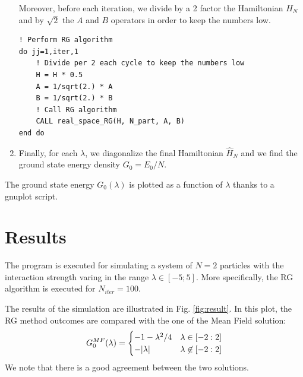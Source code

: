 \documentclass[rmp,10pt,onecolumn,fleqn,notitlepage]{revtex4-1}
\begin{document}
\begin{enumerate}
Moreover, before each iteration, we divide by a 2 factor the Hamiltonian \( H_{N} \) and by \(\sqrt{2}  \) the \( A \) and \( B \) operators in order to keep the numbers low.

\begin{minipage}[t]{0.55\linewidth}%
\begin{lstlisting}[style=Fortran]
! Perform RG algorithm
do jj=1,iter,1
    ! Divide per 2 each cycle to keep the numbers low
    H = H * 0.5
    A = 1/sqrt(2.) * A
    B = 1/sqrt(2.) * B
    ! Call RG algorithm
    CALL real_space_RG(H, N_part, A, B)
end do\end{lstlisting}
\end{minipage}


\item Finally, for each \( \lambda  \), we diagonalize the final Hamiltonian \( \hat{H}_N  \) and we find the ground state energy density \( G_0 = E _0 /N \).
\end{enumerate}

The ground state energy \( G_0 (\lambda ) \) is plotted as a function of \( \lambda \) thanks to a gnuplot script.




\section{Results}

The program is executed for simulating a system of \( N=2 \) particles with the interaction strength varing in the range \( \lambda \in [-5;5] \). More specifically, the RG algorithm is executed for \( N_{iter} = 100 \).

The results of the simulation are illustrated in Fig. \ref{fig:result}.
In this plot, the RG method outcomes are compared with the one of the Mean Field solution:
\begin{equation}
    G_0^{MF} (\lambda ) =
  \begin{cases}
   -1 - \lambda^2/4 & \lambda \in [-2:2] \\
   - \abs{\lambda } & \lambda \not \in [-2:2]
  \end{cases}
\end{equation}
We note that there is a good agreement between the two solutions.
\end{document}
